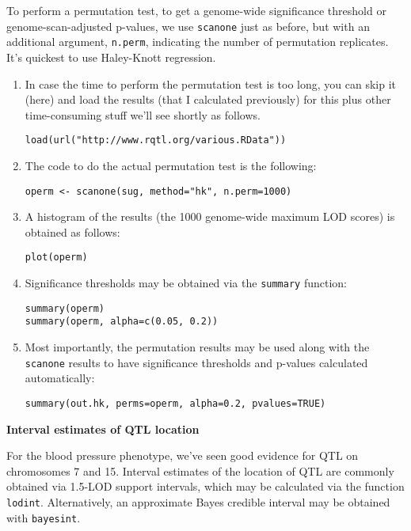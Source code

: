 \documentclass[10pt,letterpaper]{article}
\newcommand{\usercolor}{\color [named]{BlueViolet}}
\begin{document}
To perform a permutation test, to get a genome-wide significance
  threshold or genome-scan-adjusted p-values, we use \verb-scanone-
  just as before, but with an additional argument, \verb-n.perm-,
  indicating the number of permutation replicates.  It's quickest to
  use Haley-Knott regression.

\begin{enumerate}
\addtocounter{enumi}{23}

\item In case the time to perform the permutation test is too long, you can
skip it (here) and load the results (that I calculated previously) for
this plus other time-consuming stuff we'll see shortly as follows.\label{various}

\usercolor
\verb|load(url("http://www.rqtl.org/various.RData"))|
\normalcolor


\item The code to do the actual permutation test is the following:

\usercolor
\verb|operm <- scanone(sug, method="hk", n.perm=1000)|
\normalcolor

\item A histogram of the results (the 1000 genome-wide maximum LOD
  scores) is obtained as follows:

\usercolor
\verb|plot(operm)|
\normalcolor

\item Significance thresholds may be obtained via the \verb-summary-
  function:

\usercolor
\verb|summary(operm)| \\
\verb|summary(operm, alpha=c(0.05, 0.2))|
\normalcolor

\item Most importantly, the permutation results may be used along with
  the \verb-scanone- results to have significance thresholds and
  p-values calculated automatically:

\usercolor
\verb|summary(out.hk, perms=operm, alpha=0.2, pvalues=TRUE)|
\normalcolor

\end{enumerate}


\vspace{12pt}
\textbf{Interval estimates of QTL location} \vspace{6pt}
\nopagebreak

For the blood pressure phenotype, we've seen good evidence for QTL on
chromosomes 7 and 15.  Interval estimates of the location of QTL are
commonly obtained via 1.5-LOD support intervals, which may be
calculated via the function \verb-lodint-.  Alternatively, an
approximate Bayes credible interval may be obtained with
\verb-bayesint-.  
\end{document}
